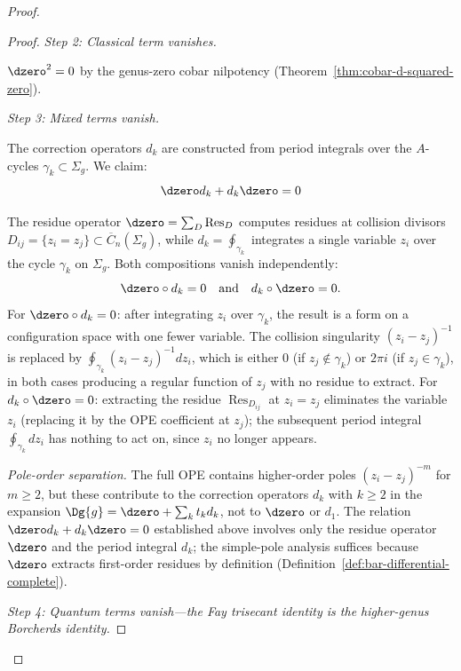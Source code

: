 \begin{proof}
\begin{proof}
\emph{Step 2: Classical term vanishes.}

$\dzero^2 = 0$ by the genus-zero cobar nilpotency (Theorem~\ref{thm:cobar-d-squared-zero}).

\emph{Step 3: Mixed terms vanish.}

The correction operators $d_k$ are constructed from period integrals over the $A$-cycles $\gamma_k \subset \Sigma_g$. We claim:
\[\dzero d_k + d_k \dzero = 0\]

The residue operator $\dzero = \sum_D \operatorname{Res}_D$ computes residues at collision divisors $D_{ij} = \{z_i = z_j\} \subset \overline{C}_n(\Sigma_g)$, while $d_k = \oint_{\gamma_k}$ integrates a single variable $z_i$ over the cycle $\gamma_k$ on $\Sigma_g$.  Both compositions vanish independently:
\[
\dzero \circ d_k = 0 \quad \text{and} \quad d_k \circ \dzero = 0.
\]
For $\dzero \circ d_k = 0$: after integrating $z_i$ over $\gamma_k$, the result is a form on a configuration space with one fewer variable.  The collision singularity $(z_i - z_j)^{-1}$ is replaced by $\oint_{\gamma_k} (z_i - z_j)^{-1} dz_i$, which is either $0$ (if $z_j \notin \gamma_k$) or $2\pi i$ (if $z_j \in \gamma_k$), in both cases producing a regular function of $z_j$ with no residue to extract.  For $d_k \circ \dzero = 0$: extracting the residue $\operatorname{Res}_{D_{ij}}$ at $z_i = z_j$ eliminates the variable $z_i$ (replacing it by the OPE coefficient at $z_j$); the subsequent period integral $\oint_{\gamma_k} dz_i$ has nothing to act on, since $z_i$ no longer appears.

\emph{Pole-order separation.}  The full OPE contains higher-order poles $(z_i - z_j)^{-m}$ for $m \geq 2$, but these contribute to the correction operators $d_k$ with $k \geq 2$ in the expansion $\Dg{g} = \dzero + \sum_k t_k d_k$, not to $\dzero$ or $d_1$.  The relation $\dzero d_k + d_k \dzero = 0$ established above involves only the residue operator $\dzero$ and the period integral $d_k$; the simple-pole analysis suffices because $\dzero$ extracts first-order residues by definition (Definition~\ref{def:bar-differential-complete}).

\emph{Step 4: Quantum terms vanish---the Fay trisecant identity
is the higher-genus Borcherds identity.}


\end{proof}
\end{proof}
